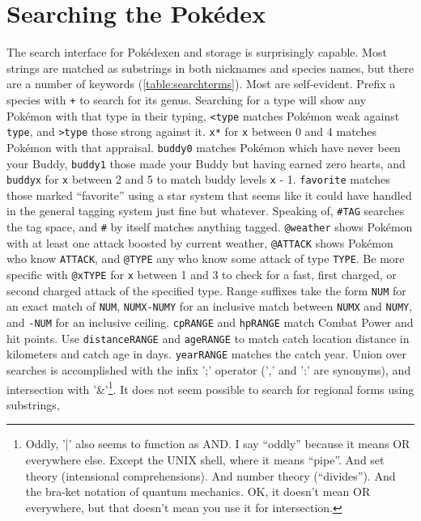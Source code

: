 \section{Searching the Pokédex\label{sec:searching}}
The search interface for Pokédexen and storage is surprisingly capable.
Most strings are matched as substrings in both nicknames and species names,
 but there are a number of keywords (\autoref{table:searchterms}).
Most are self-evident.
Prefix a species with \texttt{+} to search for its genus.
Searching for a type will show any Pokémon with that type in their typing,
 \texttt{<type} matches Pokémon weak against \texttt{type},
 and \texttt{>type} those strong against it.
\texttt{x*} for \texttt{x} between 0 and 4 matches Pokémon with that appraisal.
\texttt{buddy0} matches Pokémon which have never been your Buddy,
 \texttt{buddy1} those made your Buddy but having earned zero hearts,
 and \texttt{buddyx} for \texttt{x} between 2 and 5 to match buddy
 levels \texttt{x} - 1.
\texttt{favorite} matches those marked ``favorite'' using a star system that
 seems like it could have handled in the general tagging system just fine
 but whatever.
Speaking of, \texttt{\#TAG} searches the tag space, and \texttt{\#} by itself
 matches anything tagged.
\texttt{@weather} shows Pokémon with at least one attack boosted by current
 weather, \texttt{@ATTACK} shows Pokémon who know \texttt{ATTACK}, and \texttt{@TYPE}
 any who know some attack of type \texttt{TYPE}.
Be more specific with \texttt{@xTYPE} for \texttt{x} between 1 and 3 to check
  for a fast, first charged, or second charged attack of the specified type.
Range suffixes take the form \texttt{NUM} for an exact match of \texttt{NUM},
  \texttt{NUMX-NUMY} for an inclusive match between \texttt{NUMX} and \texttt{NUMY},
  and \texttt{-NUM} for an inclusive ceiling.
\texttt{cpRANGE} and \texttt{hpRANGE} match Combat Power and hit points.
Use \texttt{distanceRANGE} and \texttt{ageRANGE} to match catch location
  distance in kilometers and catch age in days.
\texttt{yearRANGE} matches the catch year.
Union over searches is accomplished with the infix ';' operator (',' and ':' are synonyms),
  and intersection with '\&'\footnote{Oddly, '|' also seems to function as AND. I say ``oddly'' because it means OR everywhere else.
  Except the UNIX shell, where it means ``pipe''.
  And set theory (intensional comprehensions).
  And number theory (``divides'').
  And the bra-ket notation of quantum mechanics.
  OK, it doesn't mean OR everywhere, but that doesn't mean you use it for intersection.}.
It does not seem possible to search for regional forms using substrings,
